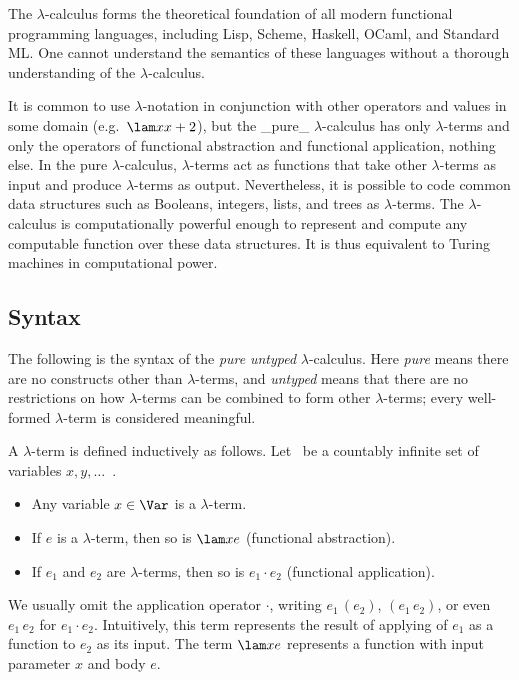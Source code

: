 The $\lambda$-calculus forms the theoretical foundation of all modern functional programming languages,
including Lisp, Scheme, Haskell, OCaml, and Standard ML. One cannot understand the semantics of these
languages without a thorough understanding of the $\lambda$-calculus.

It is common to use $\lambda$-notation in conjunction with other operators and
values in some domain (e.g.~$\lam x {x+2}$), but the _pure_ $\lambda$-calculus has
only $\lambda$-terms and only the operators of functional abstraction and functional application,
nothing else. In the pure $\lambda$-calculus, $\lambda$-terms act as functions that
take other $\lambda$-terms as input and produce $\lambda$-terms as output.
Nevertheless, it is possible to code common data structures such as Booleans, integers,
lists, and trees as $\lambda$-terms. The $\lambda$-calculus is computationally powerful
enough to represent and compute any computable function over these data structures.
It is thus equivalent to Turing machines in computational power.

\subsection{Syntax}

The following is the syntax of the \emph{pure} \emph{untyped} $\lambda$-calculus. Here \emph{pure} means there
are no constructs other than $\lambda$-terms, and \emph{untyped} means that there are no restrictions on how
$\lambda$-terms can be combined to form other $\lambda$-terms; every well-formed $\lambda$-term is considered
meaningful.

A $\lambda$-term is defined inductively as follows. Let \Var\ be a countably infinite set of variables $x,y,\ldots$~.
\begin{itemize}
\item
Any variable $x\in\Var$ is a $\lambda$-term.
\item
If $e$ is a $\lambda$-term, then so is $\lam x e$ (functional abstraction).
\item
If $e_1$ and $e_2$ are $\lambda$-terms, then so is $e_1\cdot e_2$ (functional application).
\end{itemize}
We usually omit the application operator $\cdot$, writing $e_1\,(e_2)$, $(e_1\,e_2)$, or even $e_1\,e_2$ for $e_1\cdot e_2$. Intuitively, this term represents the result of applying of $e_1$ as a function to $e_2$ as its input. The term $\lam x e$ represents a function with input parameter $x$ and body $e$.

